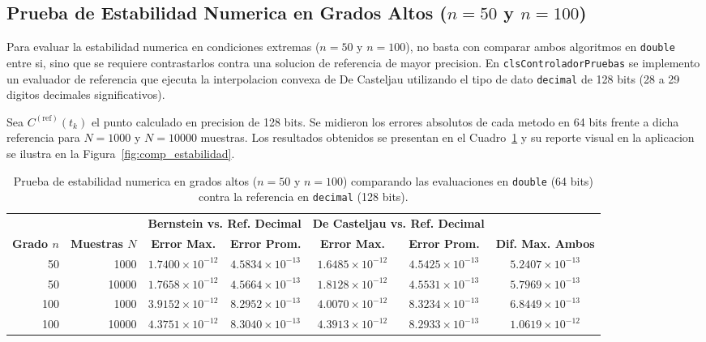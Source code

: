 \subsection{Prueba de Estabilidad Numerica en Grados Altos ($n = 50$ y $n = 100$)}
\label{subsec:comp_estabilidad}

Para evaluar la estabilidad numerica en condiciones extremas ($n = 50$ y $n = 100$), no basta con comparar ambos algoritmos en \texttt{double} entre si, sino que se requiere contrastarlos contra una solucion de referencia de mayor precision. En \texttt{clsControladorPruebas} se implemento un evaluador de referencia que ejecuta la interpolacion convexa de De Casteljau utilizando el tipo de dato \texttt{decimal} de 128 bits (28 a 29 digitos decimales significativos).

Sea $C^{(\text{ref})}(t_k)$ el punto calculado en precision de 128 bits. Se midieron los errores absolutos de cada metodo en 64 bits frente a dicha referencia para $N = 1000$ y $N = 10000$ muestras. Los resultados obtenidos se presentan en el Cuadro~\ref{tab:comp_estabilidad} y su reporte visual en la aplicacion se ilustra en la Figura~\ref{fig:comp_estabilidad}.

\begin{table}[H]
\centering
\caption{Prueba de estabilidad numerica en grados altos ($n = 50$ y $n = 100$) comparando las evaluaciones en \texttt{double} (64 bits) contra la referencia en \texttt{decimal} (128 bits).}
\label{tab:comp_estabilidad}
\footnotesize
\begin{tabular}{rr cc cc c}
\toprule
& & \multicolumn{2}{c}{\textbf{Bernstein vs. Ref. Decimal}} & \multicolumn{2}{c}{\textbf{De Casteljau vs. Ref. Decimal}} & \\
\cmidrule(lr){3-4} \cmidrule(lr){5-6}
\textbf{Grado $n$} & \textbf{Muestras $N$} & \textbf{Error Max.} & \textbf{Error Prom.} & \textbf{Error Max.} & \textbf{Error Prom.} & \textbf{Dif. Max. Ambos} \\
\midrule
50  & 1000  & $1.7400 \times 10^{-12}$ & $4.5834 \times 10^{-13}$ & $1.6485 \times 10^{-12}$ & $4.5425 \times 10^{-13}$ & $5.2407 \times 10^{-13}$ \\
50  & 10000 & $1.7658 \times 10^{-12}$ & $4.5664 \times 10^{-13}$ & $1.8128 \times 10^{-12}$ & $4.5531 \times 10^{-13}$ & $5.7969 \times 10^{-13}$ \\
100 & 1000  & $3.9152 \times 10^{-12}$ & $8.2952 \times 10^{-13}$ & $4.0070 \times 10^{-12}$ & $8.3234 \times 10^{-13}$ & $6.8449 \times 10^{-13}$ \\
100 & 10000 & $4.3751 \times 10^{-12}$ & $8.3040 \times 10^{-13}$ & $4.3913 \times 10^{-12}$ & $8.2933 \times 10^{-13}$ & $1.0619 \times 10^{-12}$ \\
\bottomrule
\end{tabular}
\end{table}

